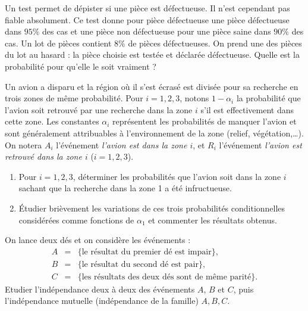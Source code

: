 \documentclass[a4paper,12pt,reqno]{amsart}
\begin{document}
\begin{exo}

  Un test permet de dépister si une pièce est défectueuse. Il n'est cependant pas fiable absolument. Ce test donne pour pièce défectueuse une pièce défectueuse dans $95\%$ des cas et une pièce non défectueuse pour une pièce saine dans $90\%$ des cas. Un lot de pièces contient $8\%$ de pièces défectueuses. On prend une des pièces du lot au hasard : la pièce choisie est testée et déclarée défectueuse. Quelle est la probabilité pour qu'elle le soit vraiment ?

\end{exo}

\begin{exo}

  Un avion a disparu et la région  où il s'est écrasé est divisée pour sa
  recherche en trois zones de même probabilité. Pour $i=1,2,3$, notons
  $1-\alpha_i$ la probabilité que l'avion soit retrouvé par une recherche
  dans la zone $i$ s'il est effectivement dans cette zone. Les constantes
  $\alpha_i$ représentent les probabilités de manquer l'avion et sont
  généralement attribuables à l'environnement de la zone (relief,
  végétation,\dots). On notera $A_i$ l'événement \emph{l'avion est dans la
  zone $i$}, et $R_i$ l'événement \emph{l'avion est retrouvé dans la zone
  $i$} ($i=1,2,3$).

  \begin{enumerate}
    \item  Pour $i=1,2,3$, déterminer les probabilités que l'avion soit dans la zone $i$ sachant que la recherche dans la zone 1 a été infructueuse.
    \item  Étudier brièvement les variations de ces trois probabilités conditionnelles considérées comme fonctions de $\alpha_1$ et commenter les résultats obtenus.
  \end{enumerate}

\end{exo}

\begin{exo}

  On lance deux dés et on considère les événements :
  \begin{eqnarray*}
    A & = & \{\text{le résultat du premier dé est impair}\},\\
    B & = & \{\text{le résultat du second dé est pair}\},\\
    C & = & \{\text{les résultats des deux dés sont de même parité}\}.
  \end{eqnarray*}
  Etudier l'indépendance deux à deux des événements $A$, $B$ et $C$,
  puis l'indépendance mutuelle (indépendance de la famille) $A,B,C$.

\end{exo}
\end{document}
